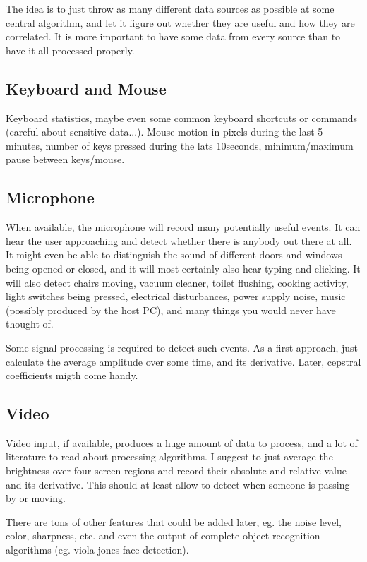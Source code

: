 \documentclass[]{article}
\begin{document}
The idea is to just throw as many different data sources as possible
at some central algorithm, and let it figure out whether they are
useful and how they are correlated. It is more important to have some
data from every source than to have it all processed properly.

\subsection{Keyboard and Mouse}

Keyboard statistics, maybe even some common keyboard shortcuts or
commands (careful about sensitive data...). Mouse motion in pixels
during the last 5 minutes, number of keys pressed during the lats
10seconds, minimum/maximum pause between keys/mouse.

\subsection{Microphone}
When available, the microphone will record many potentially useful
events. It can hear the user approaching and detect whether there is
anybody out there at all. It might even be able to distinguish the
sound of different doors and windows being opened or closed, and it
will most certainly also hear typing and clicking. It will also detect
chairs moving, vacuum cleaner, toilet flushing, cooking activity,
light switches being pressed, electrical disturbances, power supply
noise, music (possibly produced by the host PC), and many things you
would never have thought of.

Some signal processing is required to detect such events. As a first
approach, just calculate the average amplitude over some time, and its
derivative. Later, cepstral coefficients migth come handy.

\subsection{Video}
Video input, if available, produces a huge amount of data to process,
and a lot of literature to read about processing algorithms.  I
suggest to just average the brightness over four screen regions and
record their absolute and relative value and its derivative. This
should at least allow to detect when someone is passing by or moving.

There are tons of other features that could be added later, eg. the
noise level, color, sharpness, etc. and even the output of complete
object recognition algorithms (eg. viola jones face detection).
\end{document}
